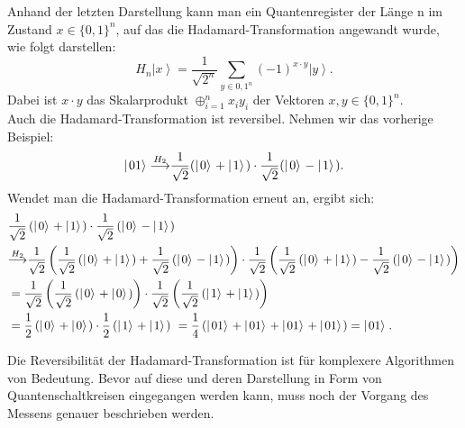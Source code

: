 Anhand der letzten Darstellung kann man ein Quantenregister der Länge n im Zustand
$x\in{\{0,1\}}^n$, auf das die Hadamard-Transformation angewandt wurde, wie folgt darstellen:
$$H_n\left|\left.x\right\rangle\right.=\frac{1}{\sqrt{2^n}}\sum_{y\in{0,1}^n}\left(-1\right)^{x\cdot y}\left|\left.y\right\rangle\right..$$
Dabei ist $x\cdot y$ das Skalarprodukt $\oplus_{i=1}^nx_iy_i$ der Vektoren $x,y\in{\{0,1\}}^n$. \\
Auch die Hadamard-Transformation ist reversibel. Nehmen wir das vorherige Beispiel:
$$\left|\left.01\right\rangle\right.{\buildrel H_2\over\longrightarrow}\frac{1}{\sqrt2}(\left|\left.0\right\rangle\right.+\left|\left.1\right\rangle\right.)\cdot\frac{1}{\sqrt2}(\left|\left.0\right\rangle\right.-\left|\left.1\right\rangle\right.).$$
Wendet man die Hadamard-Transformation erneut an, ergibt sich:
\begin{align*}
    &\frac{1}{\sqrt2}\left(\left|\left.0\right\rangle\right.+\left|\left.1\right\rangle\right.\right)\cdot\frac{1}{\sqrt2}\left(\left|\left.0\right\rangle\right.-\left|\left.1\right\rangle\right.\right)\\
    &{\buildrel H_2\over\longrightarrow}\frac{1}{\sqrt2}\left(\frac{1}{\sqrt2}\left(\left|\left.0\right\rangle\right.+\left|\left.1\right\rangle\right.\right)+\frac{1}{\sqrt2}\left(\left|\left.0\right\rangle\right.-\left|\left.1\right\rangle\right.\right)\right)\cdot\frac{1}{\sqrt2}\left(\frac{1}{\sqrt2}\left(\left|\left.0\right\rangle\right.+\left|\left.1\right\rangle\right.\right)-\frac{1}{\sqrt2}\left(\left|\left.0\right\rangle\right.-\left|\left.1\right\rangle\right.\right)\right)\\
    &=\frac{1}{\sqrt2}\left(\frac{1}{\sqrt2}\left(\left|\left.0\right\rangle\right.+\left|\left.0\right\rangle\right.\right)\right)\cdot\frac{1}{\sqrt2}\left(\frac{1}{\sqrt2}\left(\left|\left.1\right\rangle\right.+\left|\left.1\right\rangle\right.\right)\right)\\
    &=\frac{1}{2}\left(\left|\left.0\right\rangle\right.+\left|\left.0\right\rangle\right.\right)\cdot\frac{1}{2}\left(\left|\left.1\right\rangle\right.+\left|\left.1\right\rangle\right.\right)\ =\frac{1}{4}\left(\left|\left.01\right\rangle\right.+\left|\left.01\right\rangle\right.+\left|\left.01\right\rangle\right.+\left|\left.01\right\rangle\right.\right)=\left|\left.01\right\rangle\right..
\end{align*}

Die Reversibilität der Hadamard-Transformation ist für komplexere Algorithmen von Bedeutung. Bevor auf diese und deren Darstellung in Form von Quantenschaltkreisen eingegangen werden kann, muss noch der Vorgang des Messens genauer beschrieben werden.
